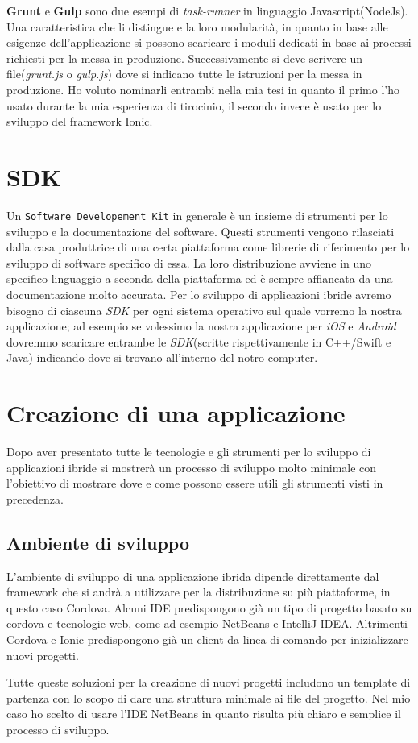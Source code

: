 \textbf{Grunt} e \textbf{Gulp} sono due esempi di \emph{task-runner} in linguaggio Javascript(NodeJs). Una caratteristica che li distingue e la loro modularità, in quanto in base alle esigenze dell'applicazione si possono scaricare i moduli dedicati in base ai processi richiesti per la messa in produzione. Successivamente si deve scrivere un file(\textit{grunt.js} o \textit{gulp.js}) dove si indicano tutte le istruzioni per la messa in produzione. Ho voluto nominarli entrambi nella mia tesi in quanto il primo l'ho usato durante la mia esperienza di tirocinio, il secondo invece è usato per lo sviluppo del framework Ionic.



\section{SDK}
Un \texttt{Software Developement Kit} in generale è un insieme di strumenti per lo sviluppo e la documentazione del software\cite{wiki:sdk}. Questi strumenti vengono rilasciati dalla casa produttrice di una certa piattaforma come librerie di riferimento per lo sviluppo di software specifico di essa. La loro distribuzione avviene in uno specifico linguaggio a seconda della piattaforma ed è sempre affiancata da una documentazione molto accurata. 
Per lo sviluppo di applicazioni ibride avremo bisogno di ciascuna \emph{SDK} per ogni sistema operativo sul quale vorremo la nostra applicazione; ad esempio se volessimo la nostra applicazione per \emph{iOS} e \emph{Android} dovremmo scaricare entrambe le \emph{SDK}(scritte rispettivamente in C++/Swift e Java) indicando dove si trovano all'interno del notro computer.

\section{Creazione di una applicazione}

Dopo aver presentato tutte le tecnologie e gli strumenti per lo sviluppo di applicazioni ibride si mostrerà un processo di sviluppo molto minimale con l'obiettivo di mostrare dove e come possono essere utili gli strumenti visti in  precedenza.

\subsection{Ambiente di sviluppo}

L'ambiente di sviluppo di una applicazione ibrida dipende direttamente dal framework che si andrà a utilizzare per la distribuzione su più piattaforme, in questo caso Cordova. Alcuni IDE predispongono già un tipo di progetto basato su cordova e tecnologie web, come ad esempio NetBeans e IntelliJ IDEA. Altrimenti Cordova e Ionic predispongono già un client da linea di comando per inizializzare nuovi progetti.

Tutte queste soluzioni per la creazione di nuovi progetti includono un template di partenza con lo scopo di dare una struttura minimale ai file del progetto. Nel mio caso ho scelto di usare l'IDE NetBeans in quanto risulta più chiaro e semplice il processo di sviluppo.


